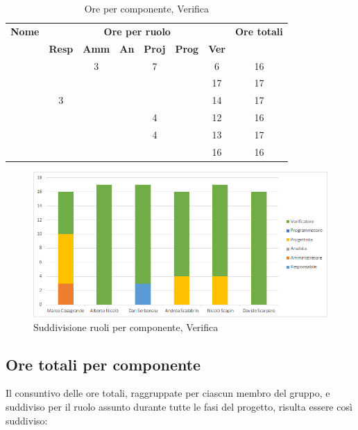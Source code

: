 \begin{table}[H]
	\begin{center}
		\begin{tabular}{|c|c|c|c|c|c|c|c|}
			\hline
			\textbf{Nome} & \multicolumn{6}{c|}{\textbf{Ore per ruolo}} & \textbf{Ore totali} \\\cline{2-7}
			& \textbf{Resp} & \textbf{Amm} & \textbf{An} & \textbf{Proj} & \textbf{Prog} & \textbf{Ver} & \\
			\hline
			\MC			&		&	3	&		&	7	&		&	6	&	16	\\
			\hline
			\AN			&		&		&		&	 	&		&	17	& 	17	\\
			\hline
			\DAN		&	3	&		&		&		&		&	14	&	17	\\
			\hline
			\AS			&		&	 	&	 	&	4	&	 	& 	12	&	16	\\
			\hline
			\NS 		&		&		&		&	4	&		& 	13	&	17	\\
			\hline
			\DS			& 		&		&		&		&		&	16	&	16	\\
			\hline
		\end{tabular}
	\end{center}
	\caption{Ore per componente, Verifica}
\end{table}

\begin{figure}[H]
	\centering
	\includegraphics[scale=0.6]{img/6-5.png}
	\caption{Suddivisione ruoli per componente, Verifica}
\end{figure}

\newpage
\subsection{Ore totali per componente}
Il consuntivo delle ore totali, raggruppate per ciascun membro del gruppo, e suddiviso per il ruolo assunto durante tutte le fasi del progetto, risulta essere così suddiviso:

